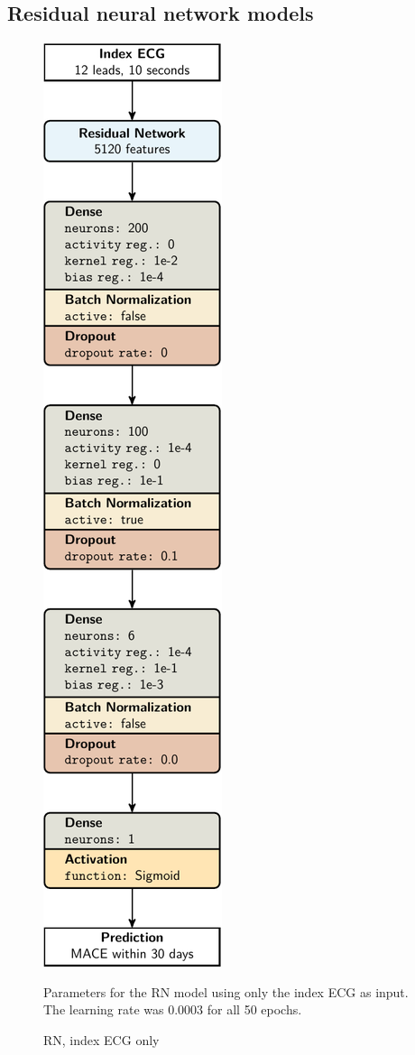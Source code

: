 \documentclass[preprint]{elsarticle}
\begin{document}
\subsection{Residual neural network models}
\begin{figure}[H]
\centering
\includegraphics[scale=\modelscale,keepaspectratio]{figures/model-rn1.pdf}
\caption{RN, index ECG only}
\medskip
\small
Parameters for the RN model using only the index ECG as input. The learning rate was 0.0003 for all 50 epochs.
\end{figure}
\end{document}
